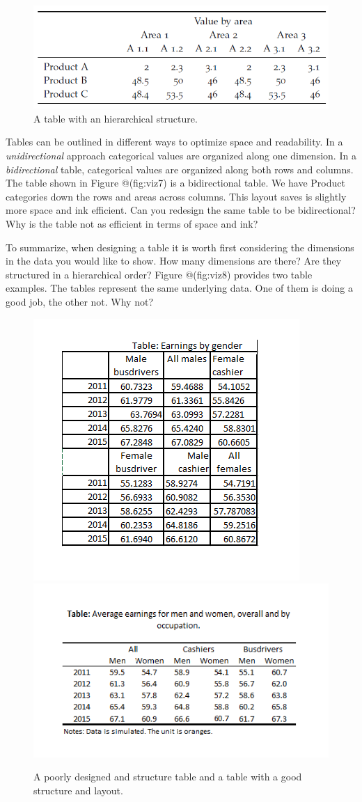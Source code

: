 \documentclass[]{book}
\begin{document}
\begin{figure}

{\centering \includegraphics[width=0.7\linewidth]{_resources/chapter_viz/tab3} 

}

\caption{A table with an hierarchical structure.}\label{fig:viz7}
\end{figure}

Tables can be outlined in different ways to optimize space and readability. In a \emph{unidirectional} approach categorical values are organized along one dimension. In a \emph{bidirectional} table, categorical values are organized along both rows and columns. The table shown in Figure @(fig:viz7) is a bidirectional table. We have Product categories down the rows and areas across columns. This layout saves is slightly more space and ink efficient. Can you redesign the same table to be bidirectional? Why is the table not as efficient in terms of space and ink?

To summarize, when designing a table it is worth first considering the dimensions in the data you would like to show. How many dimensions are there? Are they structured in a hierarchical order? Figure @(fig:viz8) provides two table examples. The tables represent the same underlying data. One of them is doing a good job, the other not. Why not?

\begin{figure}

{\centering \includegraphics[width=0.48\linewidth]{_resources/chapter_viz/poor} \includegraphics[width=0.48\linewidth]{_resources/chapter_viz/good} 

}

\caption{A poorly designed and structure table and a table with a good structure and layout.}\label{fig:viz8}
\end{figure}
\end{document}
